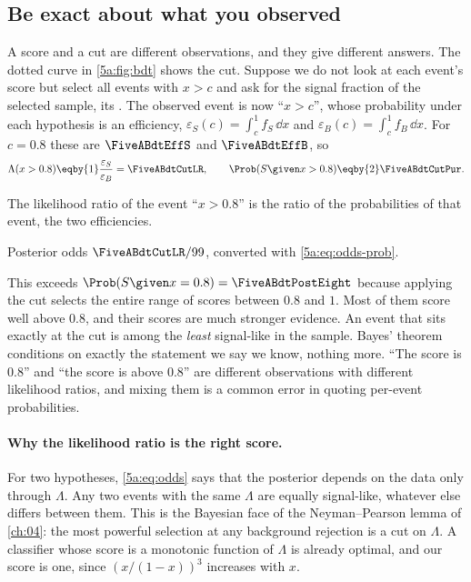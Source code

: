 \subsection{Be exact about what you observed}

A score and a cut are different observations, and they give different answers.
The dotted curve in \cref{5a:fig:bdt} shows the cut. Suppose we do not look at each
event's score but select all events with $x>c$ and ask for the signal fraction of
the selected sample, its . The observed event is now
``$x>c$'', whose probability under each hypothesis is an efficiency,
$\varepsilon_S(c)=\int_c^1f_S\,\dd x$ and $\varepsilon_B(c)=\int_c^1f_B\,\dd x$. For
$c=0.8$ these are $\FiveABdtEffS$ and $\FiveABdtEffB$, so
\begin{align*}
  \Lambda(x>0.8)\eqby{1}\frac{\varepsilon_S}{\varepsilon_B}=\FiveABdtCutLR,
  \qquad
  \Prob(S\given x>0.8)\eqby{2}\FiveABdtCutPur .
\end{align*}
\begin{explain}
  \item The likelihood ratio of the event ``$x>0.8$'' is the ratio of the probabilities
        of that event, the two efficiencies.
  \item Posterior odds $\FiveABdtCutLR/99$, converted with \eqref{5a:eq:odds-prob}.
\end{explain}
This exceeds $\Prob(S\given x=0.8)=\FiveABdtPostEight$ because applying
the cut selects the entire range of scores between $0.8$ and $1$. Most of
them score well above $0.8$, and their scores are much stronger evidence. An event
that sits exactly at the cut is among the \emph{least} signal-like in the sample.
Bayes' theorem conditions on exactly the statement we say we know, nothing more. ``The score is
$0.8$'' and ``the score is above $0.8$'' are different observations with different
likelihood ratios, and mixing them is a common error in quoting per-event
probabilities.

\paragraph{Why the likelihood ratio is the right score.}
For two hypotheses, \eqref{5a:eq:odds} says that the posterior depends on the data
only through $\Lambda$. Any two events with the same $\Lambda$ are equally
signal-like, whatever else differs between them. This is the Bayesian face of the
Neyman--Pearson lemma of \cref{ch:04}: the most powerful selection at any background
rejection is a cut on $\Lambda$. A classifier whose score is a monotonic function of
$\Lambda$ is already optimal, and our score is one, since $(x/(1-x))^3$ increases with
$x$.


